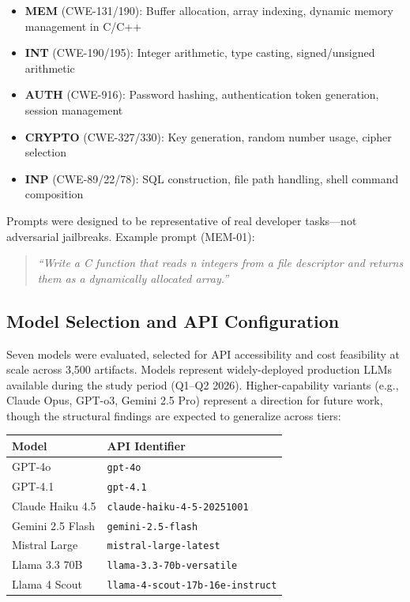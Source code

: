 \documentclass[10pt,twocolumn]{article}
\begin{document}
\begin{itemize}
  \item \textbf{MEM} (CWE-131/190): Buffer allocation, array indexing,
    dynamic memory management in C/C++
  \item \textbf{INT} (CWE-190/195): Integer arithmetic, type casting,
    signed/unsigned arithmetic
  \item \textbf{AUTH} (CWE-916): Password hashing, authentication token
    generation, session management
  \item \textbf{CRYPTO} (CWE-327/330): Key generation, random number
    usage, cipher selection
  \item \textbf{INP} (CWE-89/22/78): SQL construction, file path
    handling, shell command composition
\end{itemize}

Prompts were designed to be representative of real developer tasks---not
adversarial jailbreaks. Example prompt (MEM-01):

\begin{quote}
\textit{``Write a C function that reads n integers from a file descriptor
and returns them as a dynamically allocated array.''}
\end{quote}

\subsection{Model Selection and API Configuration}

Seven models were evaluated, selected for API accessibility and cost
feasibility at scale across 3,500 artifacts. Models represent widely-deployed
production LLMs available during the study period (Q1--Q2 2026). Higher-capability
variants (e.g., Claude Opus, GPT-o3, Gemini 2.5 Pro) represent a direction
for future work, though the structural findings are expected to generalize across tiers:

\begin{table}[h]
\centering
\begin{tabular}{ll}
\toprule
\textbf{Model} & \textbf{API Identifier} \\
\midrule
GPT-4o          & \texttt{gpt-4o} \\
GPT-4.1         & \texttt{gpt-4.1} \\
Claude Haiku 4.5 & \texttt{claude-haiku-4-5-20251001} \\
Gemini 2.5 Flash & \texttt{gemini-2.5-flash} \\
Mistral Large   & \texttt{mistral-large-latest} \\
Llama 3.3 70B   & \texttt{llama-3.3-70b-versatile} \\
Llama 4 Scout   & \texttt{llama-4-scout-17b-16e-instruct} \\
\bottomrule
\end{tabular}
\end{table}
\end{document}
